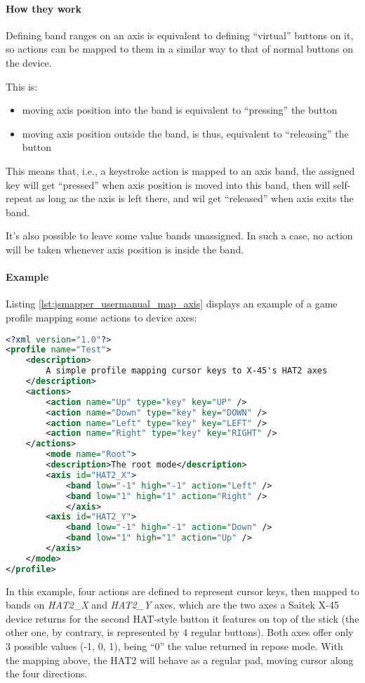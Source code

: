 \paragraph{How they work}
Defining band ranges on an axis is equivalent to defining ``virtual'' buttons on it, so actions can be mapped to them in a similar way to that of normal buttons on the device. 

This is:
\begin{itemize}
	\item moving axis position into the band is equivalent to ``pressing'' the button
	\item moving axis position outside the band, is thus, equivalent to ``releasing'' the button
\end{itemize}

This means that, i.e., a keystroke action is mapped to an axis band, the assigned key will get ``pressed'' when axis position is moved into this band, then will self-repeat as long as the axis is left there, and wil get ``released'' when axis exits the band. 

It's also possible to leave some value bands unassigned. In such a case, no action will be taken whenever axis position is inside the band.

\paragraph{Example}
Listing \ref{lst:jsmapper_usermanual_map_axis} displays an example of a game profile mapping some actions to device axes:
\begin{lstlisting}[language=XML,caption={Mapping axes},label={lst:jsmapper_usermanual_map_axis}]
<?xml version="1.0"?>
<profile name="Test">
	<description>
		A simple profile mapping cursor keys to X-45's HAT2 axes
	</description>
	<actions>
		<action name="Up" type="key" key="UP" />
		<action name="Down" type="key" key="DOWN" />
		<action name="Left" type="key" key="LEFT" />
		<action name="Right" type="key" key="RIGHT" />
	</actions>
		<mode name="Root">
		<description>The root mode</description>
		<axis id="HAT2_X">
			<band low="-1" high="-1" action="Left" />
			<band low="1" high="1" action="Right" />
			</axis>
		<axis id="HAT2_Y">
			<band low="-1" high="-1" action="Down" />
			<band low="1" high="1" action="Up" />
		</axis>
	</mode>
</profile>
\end{lstlisting}

In this example, four actions are defined to represent cursor keys, then mapped to bands on \emph{HAT2\_X} and \emph{HAT2\_Y} axes, which are the two axes a Saitek X-45 device returns for the second HAT-style button it features on top of the stick (the other one, by contrary, is represented by 4 regular buttons). 
Both axes offer only 3 possible values (-1, 0, 1), being ``0'' the value returned in repose mode. With the mapping above, the HAT2 will behave as a regular pad, moving cursor along the four directions.


